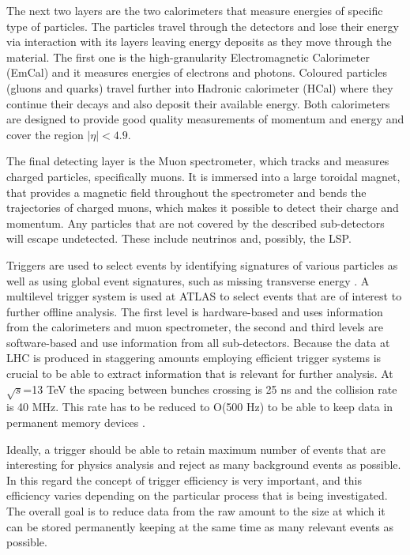 The next two layers are the two calorimeters that measure energies of specific type of particles. The particles travel through the detectors and lose their energy via interaction with its layers leaving energy deposits as they move through the material. 
The first one is the high-granularity Electromagnetic Calorimeter (EmCal) and it measures energies of electrons and photons. Coloured particles (gluons and quarks) travel further into Hadronic calorimeter (HCal) where they continue their decays and also deposit their available energy. 
Both calorimeters are  designed to provide good quality measurements of momentum and energy and cover the region $|\eta|<4.9$.

The final detecting layer is the Muon spectrometer, which tracks and measures charged particles, specifically muons. It is immersed into a large toroidal magnet, that provides a magnetic field throughout the spectrometer and bends the trajectories of charged muons, which makes it possible to detect their charge and momentum. Any particles that are not covered by the described sub-detectors will escape undetected. These include neutrinos and, possibly, the LSP. 

Triggers are used to select events by identifying signatures of various particles as well as using global event signatures, such as missing transverse energy \citep{aad2012performance}. A multilevel trigger system is used at ATLAS to select events that are of interest to further offline analysis. 
The  first  level is hardware-based and uses information from the calorimeters and muon spectrometer, the second and third levels are software-based and use information from all sub-detectors. Because the data at LHC is produced in staggering amounts employing efficient trigger systems is crucial to be able to extract information that is relevant for further analysis. At $\sqrt{s}$=13 TeV the spacing between bunches crossing is 25 ns and the collision rate is 40 MHz. This rate has to be reduced to O(500 Hz) to be able to keep data in permanent memory devices \citep{barr2015particle}.

Ideally, a trigger should be able to retain maximum number of events that are interesting for physics analysis and reject as many background events as possible. In this regard the concept of trigger efficiency is very important, and this efficiency varies depending on the particular process that is being investigated. The overall goal is to reduce data from the raw amount to the size at which it can be stored permanently keeping at the same time as many relevant events as possible. 
